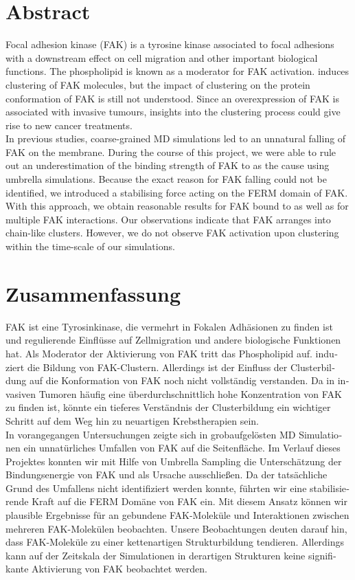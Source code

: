 \chapter*{Abstract}
Focal adhesion kinase (FAK) is a tyrosine kinase associated to focal adhesions with a downstream effect on cell migration and other important biological functions. The phospholipid \pip{} is known as a moderator for FAK activation. \pip{} induces clustering of FAK molecules, but the impact of clustering on the protein conformation of FAK is still not understood. Since an overexpression of FAK is associated with invasive tumours, insights into the clustering process could give rise to new cancer treatments.\\
In previous studies, coarse-grained MD simulations led to an unnatural falling of FAK on the membrane. During the course of this project, we were able to rule out an underestimation of the binding strength of FAK to \pip{} as the cause using umbrella simulations. Because the exact reason for FAK falling could not be identified, we introduced a stabilising force acting on the FERM domain of FAK. With this approach, we obtain reasonable results for FAK bound to \pip{} as well as for multiple FAK interactions. Our observations indicate that FAK arranges into chain-like clusters. However, we do not observe FAK activation upon clustering within the time-scale of our simulations.
\newpage
\leavevmode\thispagestyle{empty}\newpage
\chapter*{Zusammenfassung}
\begin{german}
	FAK ist eine Tyrosinkinase, die vermehrt in Fokalen Adhäsionen zu finden ist und regulierende Einflüsse auf Zellmigration und andere biologische Funktionen hat. Als Moderator der Aktivierung von FAK tritt das Phospholipid \pip{} auf. \pip{} induziert die Bildung von FAK-Clustern. Allerdings ist der Einfluss der Clusterbildung auf die Konformation von FAK noch nicht vollständig verstanden. Da in invasiven Tumoren häufig eine überdurchschnittlich hohe Konzentration von FAK zu finden ist, könnte ein tieferes Verständnis der Clusterbildung ein wichtiger Schritt auf dem Weg hin zu neuartigen Krebstherapien sein.\\
	In vorangegangen Untersuchungen zeigte sich in grobaufgelösten MD Simulationen ein unnatürliches Umfallen von FAK auf die Seitenfläche. Im Verlauf dieses Projektes konnten wir mit Hilfe von Umbrella Sampling die Unterschätzung der Bindungsenergie von FAK und \pip{} als Ursache ausschließen. Da der tatsächliche Grund des Umfallens nicht identifiziert werden konnte, führten wir eine stabilisierende Kraft auf die FERM Domäne von FAK ein. Mit diesem Ansatz können wir plausible Ergebnisse für an \pip{} gebundene FAK-Moleküle und Interaktionen zwischen mehreren FAK-Molekülen beobachten. Unsere Beobachtungen deuten darauf hin, dass FAK-Moleküle zu einer kettenartigen Strukturbildung tendieren. Allerdings kann auf der Zeitskala der Simulationen in derartigen Strukturen keine signifikante Aktivierung von FAK beobachtet werden.
\end{german}
\newpage
